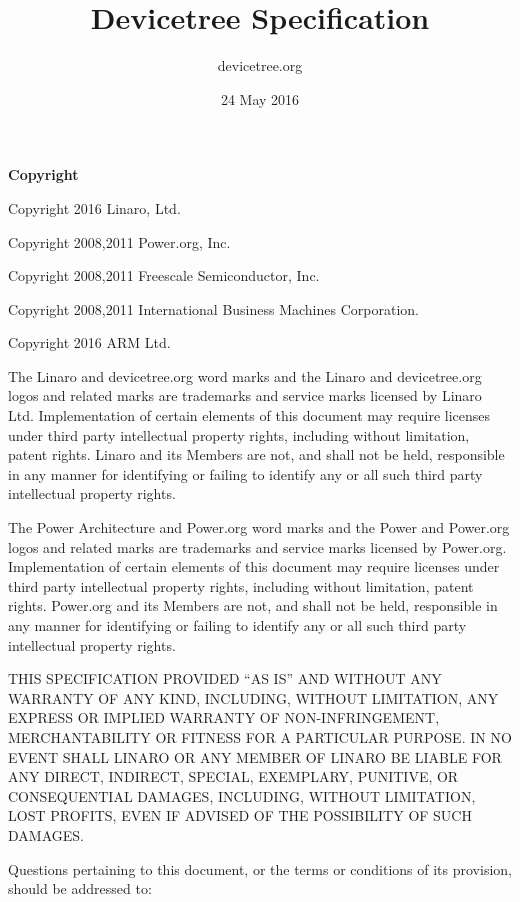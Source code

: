 \documentclass[a4paper,10pt,oneside]{sphinxmanual}
\title{Devicetree Specification}
\date{24 May 2016}
\author{devicetree.org}
\begin{document}
\maketitle
\tableofcontents
{}\label{index::doc}


\textbf{Copyright}

\begin{DUlineblock}{0em}
\item[] Copyright 2016 Linaro, Ltd.
\item[] Copyright 2008,2011 Power.org, Inc.
\item[] Copyright 2008,2011 Freescale Semiconductor, Inc.
\item[] Copyright 2008,2011 International Business Machines Corporation.
\item[] Copyright 2016 ARM Ltd.
\end{DUlineblock}

The Linaro and devicetree.org word marks and the Linaro and
devicetree.org logos and related marks are trademarks and service marks
licensed by Linaro Ltd. Implementation of certain elements of this
document may require licenses under third party intellectual property
rights, including without limitation, patent rights. Linaro and its
Members are not, and shall not be held, responsible in any manner for
identifying or failing to identify any or all such third party
intellectual property rights.

The Power Architecture and Power.org word marks and the Power and
Power.org logos and related marks are trademarks and service marks
licensed by Power.org. Implementation of certain elements of this
document may require licenses under third party intellectual property
rights, including without limitation, patent rights. Power.org and its
Members are not, and shall not be held, responsible in any manner for
identifying or failing to identify any or all such third party
intellectual property rights.

THIS SPECIFICATION PROVIDED “AS IS” AND WITHOUT ANY WARRANTY
OF ANY KIND, INCLUDING, WITHOUT LIMITATION, ANY EXPRESS OR IMPLIED
WARRANTY OF NON-INFRINGEMENT, MERCHANTABILITY OR FITNESS FOR A
PARTICULAR PURPOSE. IN NO EVENT SHALL LINARO OR ANY MEMBER OF
LINARO BE LIABLE FOR ANY DIRECT, INDIRECT, SPECIAL, EXEMPLARY,
PUNITIVE, OR CONSEQUENTIAL DAMAGES, INCLUDING, WITHOUT LIMITATION, LOST
PROFITS, EVEN IF ADVISED OF THE POSSIBILITY OF SUCH DAMAGES.

Questions pertaining to this document, or the terms or conditions of its
provision, should be addressed to:
\end{document}
